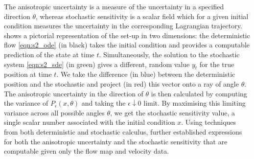The anisotropic uncertainty is a measure of the uncertainty in a specified direction \(\theta\), whereas stochastic sensitivity is a scalar field which for a given initial condition measures the uncertainty in the corresponding Lagrangian trajectory.
 shows a pictorial representation of the set-up in two dimensions: the deterministic flow \cref{eqn:s2_ode} (in black) takes the initial condition and provides a computable prediction of the state at time \(t\).
Simultaneously, the solution to the stochastic system \cref{eqn:s2_sde} (in green) gives a different, random value \(y_t\) for the true position at time \(t\).
We take the difference (in blue) between the deterministic position and the stochastic and project (in red) this vector onto a ray of angle \(\theta\).
The anisotropic uncertainty in the direction of \(\theta\) is then calculated by computing the variance of \(P_{\epsilon}\!\left(x, \theta\right)\) and taking the \(\epsilon\downarrow 0\) limit.
By maximising this limiting variance across all possible angles \(\theta\), we get the stochastic sensitivity value, a single scalar number associated with the initial condition \(x\).
Using techniques from both deterministic and stochastic calculus, \citet{Balasuriya_2020_StochasticSensitivityComputable} further established expressions for both the anisotropic uncertainty and the stochastic sensitivity that are computable given only the flow map and velocity data.

